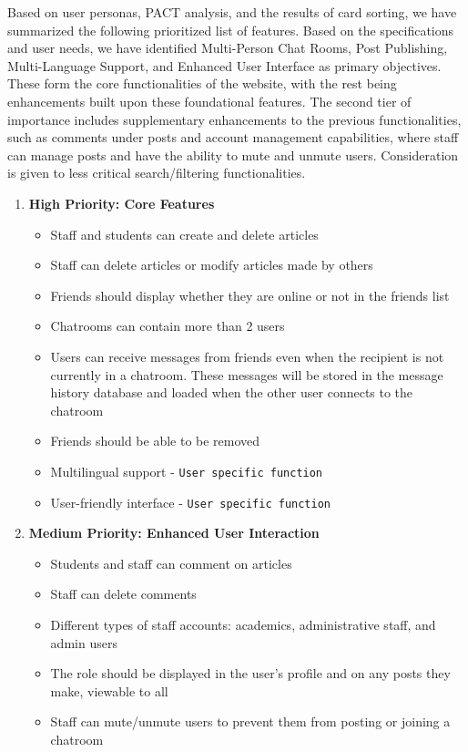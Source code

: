 \documentclass[12pt]{article}
\begin{document}
    \hspace{2em}Based on user personas, PACT analysis, and the results of card sorting, we have summarized the following prioritized list of features. Based on the specifications and user needs, we have identified Multi-Person Chat Rooms, Post Publishing, Multi-Language Support, and Enhanced User Interface as primary objectives. These form the core functionalities of the website, with the rest being enhancements built upon these foundational features. The second tier of importance includes supplementary enhancements to the previous functionalities, such as comments under posts and account management capabilities, where staff can manage posts and have the ability to mute and unmute users. Consideration is given to less critical search/filtering functionalities.
    \begin{enumerate}
    \item \textbf{High Priority: Core Features}
        \begin{itemize}
            \item Staff and students can create and delete articles
            \item Staff can delete articles or modify articles made by others
            \item Friends should display whether they are online or not in the friends list
            \item Chatrooms can contain more than 2 users
            \item Users can receive messages from friends even when the recipient is not currently in a chatroom. These messages will be stored in the message history database and loaded when the other user connects to the chatroom
            \item Friends should be able to be removed
            \item Multilingual support - \texttt{User specific function}
            \item User-friendly interface - \texttt{User specific function}
        \end{itemize}

    \item \textbf{Medium Priority: Enhanced User Interaction}
        \begin{itemize}
            \item Students and staff can comment on articles
            \item Staff can delete comments
            \item Different types of staff accounts: academics, administrative staff, and admin users
            \item The role should be displayed in the user’s profile and on any posts they make, viewable to all
            \item Staff can mute/unmute users to prevent them from posting or joining a chatroom
        \end{itemize}


\end{enumerate}
\end{document}
